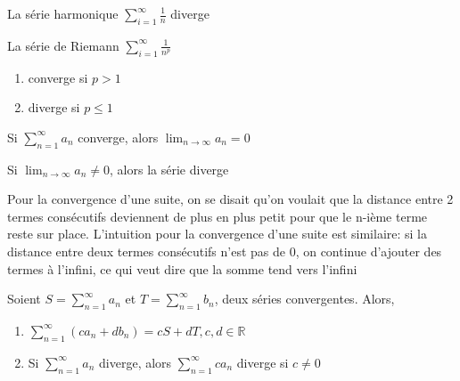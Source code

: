 \documentclass{article}
\begin{document}
\begin{proposition}
    La série harmonique $ \sum^{\infty}_{i=1} \frac{1}{n}  $ diverge
\end{proposition}

\begin{proposition}
\end{proposition}

\begin{proposition}
    La série de Riemann $ \sum^{\infty}_{i=1} \frac{1}{n^p}$
    \begin{enumerate}
        \item converge si $ p > 1$
	\item diverge si $ p \leq 1 $
    \end{enumerate}
\end{proposition}

\begin{theorem}
    Si $\sum_{n=1}^{\infty} a_n$ converge, alors
    $\lim_{n \to \infty} a_n=0$
\end{theorem}

\begin{corollary}
    Si $\lim_{n \to \infty} a_n \neq 0$, alors la série diverge
\end{corollary}

\begin{intuition}
    Pour la convergence d'une suite, on se disait qu'on voulait que
    la distance entre 2 termes consécutifs deviennent de plus en plus
    petit pour que le n-ième terme reste sur place. L'intuition pour
    la convergence d'une suite est similaire: si la distance entre
    deux termes consécutifs n'est pas de 0, on continue d'ajouter des
    termes à l'infini, ce qui veut dire que la somme tend vers l'infini
\end{intuition}

\begin{theorem}
    Soient $S = \sum_{n=1}^{\infty} a_n$ et $T = \sum_{n=1}^{\infty} b_n$,
    deux séries convergentes. Alors,
    \begin{enumerate}
	\item $\sum_{n=1}^{\infty} (c a_n + d b_n) = cS + dT, c,d \in
	    \mathbb{R}$
	\item Si $\sum_{n=1}^{\infty} a_n$ diverge, alors
	    $\sum_{n=1}^{\infty} c a_n$ diverge si $ c \neq 0$
    \end{enumerate}
\end{theorem}
\end{document}
